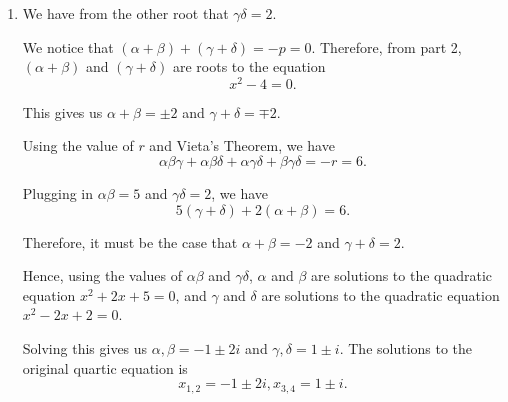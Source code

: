 \begin{enumerate}
    \item We have from the other root that \(\gamma\delta = 2\).

          We notice that \((\alpha + \beta) + (\gamma + \delta) = -p = 0\). Therefore, from part 2, \((\alpha + \beta)\) and \((\gamma + \delta)\) are roots to the equation
          \[
              x^2 - 4 = 0.
          \]

          This gives us \(\alpha + \beta = \pm 2\) and \(\gamma + \delta = \mp 2\).

          Using the value of \(r\) and Vieta's Theorem, we have
          \[
              \alpha\beta\gamma + \alpha\beta\delta + \alpha\gamma\delta + \beta\gamma\delta = -r = 6.
          \]

          Plugging in \(\alpha\beta = 5\) and \(\gamma\delta = 2\), we have
          \[
              5(\gamma + \delta) + 2(\alpha + \beta) = 6.
          \]

          Therefore, it must be the case that \(\alpha + \beta = -2\) and \(\gamma + \delta = 2\).

          Hence, using the values of \(\alpha\beta\) and \(\gamma\delta\), \(\alpha\) and \(\beta\) are solutions to the quadratic equation \(x^2 + 2x + 5 = 0\), and \(\gamma\) and \(\delta\) are solutions to the quadratic equation \(x^2 - 2x + 2 = 0\).

          Solving this gives us \(\alpha, \beta = -1 \pm 2i\) and \(\gamma, \delta = 1 \pm i\). The solutions to the original quartic equation is
          \[
              x_{1, 2} = -1 \pm 2i, x_{3, 4} = 1 \pm i.
          \]
\end{enumerate}
